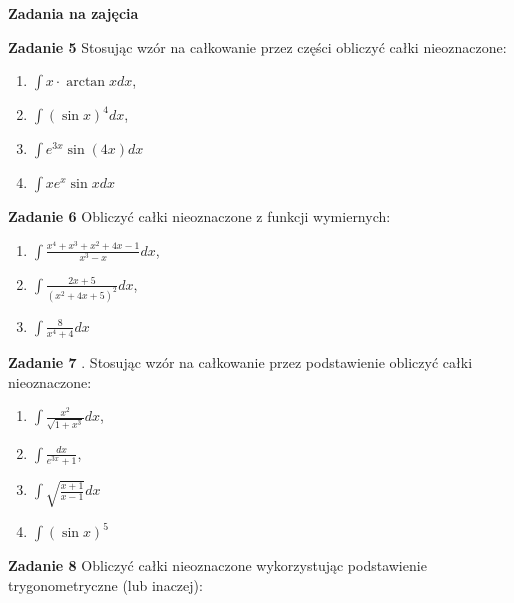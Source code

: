 \documentclass[a4paper,11pt]{article}
\begin{document}
\begin{center}
    \textbf{Zadania na zajęcia}
\end{center}

\bigskip

\textbf{Zadanie 5} Stosując wzór na całkowanie przez części 
obliczyć całki nieoznaczone:

\begin{multicols}{4}
    \begin{enumerate}
        \item $\int x \cdot \arctan x dx$,
        \item $\int (\sin x)^4 dx$,
        \item $\int e^{3x} \sin (4x) dx$
        \item $\int x e^x \sin x dx$
    \end{enumerate}
\end{multicols}

\bigskip

\textbf{Zadanie 6} Obliczyć całki nieoznaczone z funkcji wymiernych:

\begin{multicols}{3}
    \begin{enumerate}
        \item $\int \frac{x^4 + x^3 + x^2 + 4x -1}{x^3 - x} dx$,
        \item $\int \frac{2x+5}{(x^2 + 4x + 5)^2} dx$,
        \item $\int \frac{8}{x^4+4} dx$
    \end{enumerate}
\end{multicols}

\bigskip

\textbf{Zadanie 7} . Stosując wzór na całkowanie przez podstawienie obliczyć całki nieoznaczone:

\begin{multicols}{4}
    \begin{enumerate}
        \item $\int \frac{x^2}{\sqrt{1+x^3}} dx$,
        \item $\int \frac{dx}{e^{3x}+1}$,
        \item $\int \sqrt{\frac{x+1}{x-1}} dx$
        \item $\int (\sin x)^5$
    \end{enumerate}
\end{multicols}

\bigskip

\textbf{Zadanie 8} Obliczyć całki nieoznaczone wykorzystując podstawienie trygonometryczne (lub inaczej):
\end{document}
